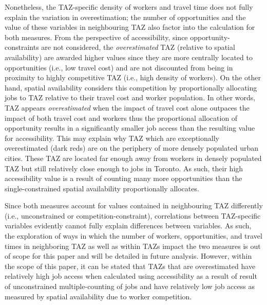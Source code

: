 \documentclass[]{elsarticle} %
\begin{document}
Nonetheless, the TAZ-specific density of workers and travel time does
not fully explain the variation in overestimation; the number of
opportunities and the value of these variables in neighbouring TAZ also
factor into the calculation for both measures. From the perspective of
accessibility, since opportunity-constraints are not considered, the
\emph{overestimated} TAZ (relative to spatial availability) are awarded
higher values since they are more centrally located to opportunities
(i.e., low travel cost) and are not discounted from being in proximity
to highly competitive TAZ (i.e., high density of workers). On the other
hand, spatial availability considers this competition by proportionally
allocating jobs to TAZ relative to their travel cost and worker
population. In other words, TAZ appears \emph{overestimated} when the
impact of travel cost alone outpaces the impact of both travel cost and
workers thus the proportional allocation of opportunity results in a
significantly smaller job access than the resulting value for
accessibility. This may explain why TAZ which are exceptionally
overestimated (dark reds) are on the periphery of more densely populated
urban cities. These TAZ are located far enough away from workers in
densely populated TAZ but still relatively close enough to jobs in
Toronto. As such, their high accessibility value is a result of counting
many more opportunities than the single-constrained spatial availability
proportionally allocates.

Since both measures account for values contained in neighbouring TAZ
differently (i.e., unconstrained or competition-constraint),
correlations between TAZ-specific variables evidently cannot fully
explain differences between variables. As such, the exploration of ways
in which the number of workers, opportunities, and travel times in
neighboring TAZ as well as within TAZs impact the two measures is out of
scope for this paper and will be detailed in future analysis. However,
within the scope of this paper, it can be stated that TAZs that are
overestimated have relatively high job access when calculated using
accessibility as a result of result of unconstrained multiple-counting
of jobs and have relatively low job access as measured by spatial
availability due to worker competition.
\end{document}
